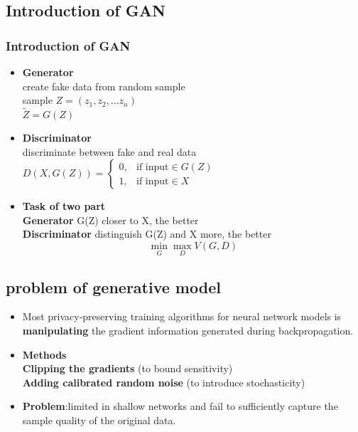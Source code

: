 \documentclass{beamer}
\begin{document}
\subsection{Introduction of GAN}
\begin{frame}
    \frametitle{Introduction of GAN}
    \begin{itemize}
        \item \textbf{Generator}\\[5pt]
        create fake data from random sample\\
        sample $Z = (z_1,z_2,...z_n)$\\
        $\tilde{Z} = G(Z)$\\
        \item \textbf{Discriminator}\\[5pt]
        discriminate between fake and real data\\
        $D(X, G(Z)) = \begin{cases}
                      0, & \mbox{if input} \in G(Z)\\
                      1, & \mbox{if input} \in X
                      \end{cases}$
        \item \textbf{Task of two part}\\[5pt]
        \textbf{Generator}
        G(Z) closer to X, the better\\
        \textbf{Discriminator}
        distinguish G(Z) and X more, the better\\
        {$$\mathop{\min}\limits_{G}\mathop{\max}\limits_{D} V(G,D)$$}
    \end{itemize}
\end{frame}

\subsection{problem of generative model}
\begin{frame}
    \begin{itemize}
    \item Most privacy-preserving training algorithms for neural network models is \textbf{manipulating}
  the gradient information generated during backpropagation.
    \item \textbf{Methods}\\
      \textbf{Clipping the gradients} (to bound sensitivity)\\
      \textbf{Adding calibrated random noise} (to introduce stochasticity)
    \item \textbf{Problem}:limited in shallow networks and fail to sufficiently capture the sample quality of the
  original data.

  \end{itemize} 
\end{frame}
\end{document}
